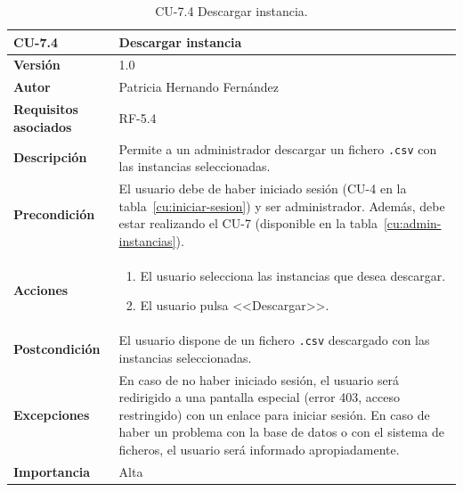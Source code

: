 \begin{table}[p]
	\centering
	\begin{tabularx}{\linewidth}{ p{} p{} }
		\toprule
		\textbf{CU-7.4}    & \textbf{Descargar instancia}\\
		\toprule
		\textbf{Versión}              & 1.0    \\
		\textbf{Autor}                & Patricia Hernando Fernández \\
		\textbf{Requisitos asociados} & RF-5.4 \\
		\textbf{Descripción}          & Permite a un administrador descargar un fichero \texttt{.csv} con las instancias seleccionadas.\\
		\textbf{Precondición}         & El usuario debe de haber iniciado sesión (CU-4 en la tabla~\ref{cu:iniciar-sesion}) y ser administrador. Además, debe estar realizando el CU-7 (disponible en la tabla~\ref{cu:admin-instancias}). \\
		\textbf{Acciones}             &
		\begin{enumerate}
			\def\labelenumi{\arabic{enumi}.}
			\tightlist
			\item El usuario selecciona las instancias que desea descargar.
			\item El usuario pulsa <<Descargar>>.
		\end{enumerate}\\
		\textbf{Postcondición}        & El usuario dispone de un fichero \texttt{.csv} descargado con las instancias seleccionadas.\\
		\textbf{Excepciones}          & En caso de no haber iniciado sesión, el usuario será redirigido a una pantalla especial (error 403, acceso restringido) con un enlace para iniciar sesión. En caso de haber un problema con la base de datos o con el sistema de ficheros, el usuario será informado apropiadamente.\\
		\textbf{Importancia}          & Alta \\
		\bottomrule
	\end{tabularx}
	\caption{CU-7.4 Descargar instancia.}
	\label{cu:descargar-instancia}
\end{table}



